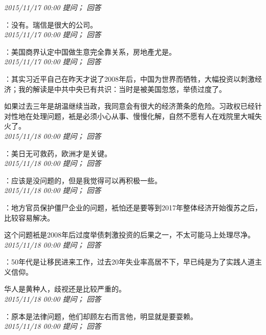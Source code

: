 \documentclass[twocolumn]{ctexart}
\begin{document}
\textit{\hfill\noindent\small 2015/11/17 00:00 提问； 回答}

：没有。瑞信是很大的公司。\\

\textit{\hfill\noindent\small 2015/11/17 00:00 提问； 回答}

：美国商界认定中国做生意完全靠关系，房地產尤是。\\

\textit{\hfill\noindent\small 2015/11/17 00:00 提问； 回答}

：其实习近平自己在昨天才说了2008年后，中国为世界而牺牲，大幅投资以刺激经济；我的解读是中共中央已有共识：当时是被美国忽悠，举债过度了。

如果过去三年是胡温继续当政，我同意会有很大的经济萧条的危险。习政权已经针对性地在处理问题，衹是必须小心从事、慢慢化解，自然不愿有人在戏院里大喊失火了。\\

\textit{\hfill\noindent\small 2015/11/18 00:00 提问； 回答}

：美日无可救药，欧洲才是关键。\\

\textit{\hfill\noindent\small 2015/11/18 00:00 提问； 回答}

：应该是没问题的，但是我觉得可以再积极一些。\\

\textit{\hfill\noindent\small 2015/11/18 00:00 提问； 回答}

：地方官员保护僵尸企业的问题，衹怕还是要等到2017年整体经济开始復苏之后，比较容易解决。

这个问题衹是2008年后过度举债刺激投资的后果之一，不太可能马上处理尽净。\\

\textit{\hfill\noindent\small 2015/11/18 00:00 提问； 回答}

：50年代是让移民进来工作，过去20年失业率高居不下，早已纯是为了实践人道主义信仰。

华人是黄种人，歧视还是比较严重的。\\

\textit{\hfill\noindent\small 2015/11/18 00:00 提问； 回答}

：原本是法律问题，他们却顾左右而言他，明显就是要耍赖。\\

\textit{\hfill\noindent\small 2015/11/18 00:00 提问； 回答}
\end{document}
